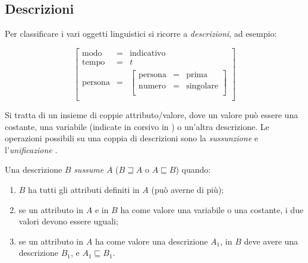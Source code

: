 \documentclass[twoside,stylearticle,11pt,filologia,it,article,bibsection]{spinoza}
\newcommand\spzmsussume{\sqsupseteq}
\newcommand\spzmsussunto{\sqsubseteq}
\newenvironment{lingmeq}{\begin{lingeq}\[}{\]\end{lingeq}}
\begin{document}
\subsection{Descrizioni}

\label{sec:descrizioni}

Per classificare i vari oggetti linguistici si ricorre a {\it
  descrizioni}, ad esempio:

\begin{lingmeq}
\label{leq:descesempio}
\left[\begin{array}{lll}
\text{modo}&=&\text{indicativo}\\
\text{tempo}&=&t\\
\text{persona}&=&\left[\begin{array}{lll}
  \text{persona}&=&\text{prima}\\
  \text{numero}&=&\text{singolare}\\
\end{array}\right]\\
\end{array}\right]
\end{lingmeq}

Si tratta di un insieme di coppie attributo/valore, dove un valore può
essere una costante, una variabile (indicate in corsivo in
) o un'altra descrizione. Le operazioni
possibili su una coppia di descrizioni sono la {\it sussunzione} e
l'{\it unificazione} 
.

Una descrizione $B$ {\it sussume} $A$ ($B \spzmsussume A$ o $A
\spzmsussunto B$) quando:

\begin{enumerate}
\item $B$ ha tutti gli attributi definiti in $A$ (può averne
  di più);
\item se un attributo in $A$ e in $B$ ha come valore una variabile o
  una costante, i due valori devono essere uguali;
\item se un attributo in $A$ ha come valore una descrizione $A_1$, in
   $B$ deve avere una descrizione $B_1$, e $A_1 \spzmsussunto B_1$.
\end{enumerate}
\end{document}
